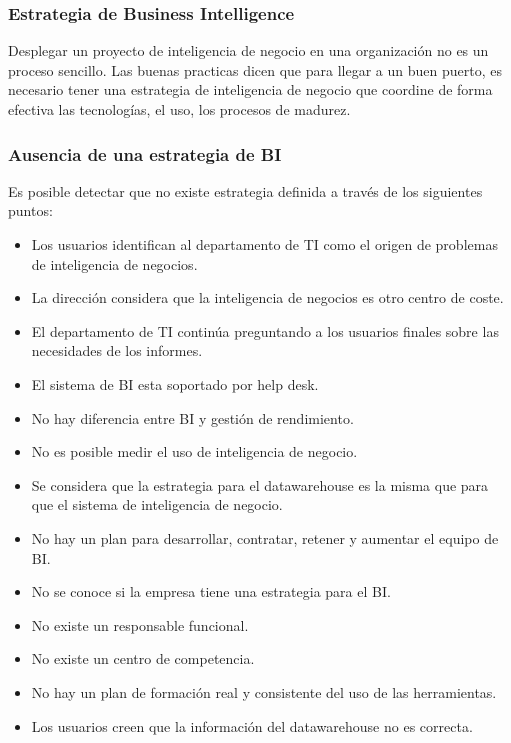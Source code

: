 \documentclass[preprint,12pt]{elsarticle}
\begin{document}
	\subsubsection{\textbf{Estrategia de Business Intelligence}}
	Desplegar un proyecto de inteligencia de negocio en una organización no es un proceso sencillo. Las buenas practicas dicen 
	que para llegar a un buen puerto, es necesario tener una estrategia de inteligencia de negocio que coordine de forma efectiva 
	las tecnologías, el uso, los procesos de madurez.\cite{referenciarobles2}
	\subsubsection{\textbf{Ausencia de una estrategia de BI}}
	Es posible detectar que no existe estrategia definida a través de los siguientes puntos:

	\begin{itemize}
	\item Los usuarios identifican al departamento de TI como el origen de problemas de inteligencia de negocios.
	\item La dirección considera que la inteligencia de negocios es otro centro de coste.
	\item El departamento de TI continúa preguntando a los usuarios finales sobre las necesidades de los informes.
	\item El sistema de BI esta soportado por help desk.
	\item No hay diferencia entre BI y gestión de rendimiento.
	\item No es posible medir el uso de inteligencia de negocio.
	\item Se considera que la estrategia para el datawarehouse es la misma que para que el sistema de inteligencia de negocio.

	\item No hay un plan para desarrollar, contratar, retener y aumentar el equipo de BI.
	\item No se conoce si la empresa tiene una estrategia para el BI.
	\item No existe un responsable funcional.
	\item No existe un centro de competencia.
	\item No hay un plan de formación real y consistente del uso de las herramientas.
	\item Los usuarios creen que la información del datawarehouse no es correcta.
	\end{itemize}
\end{document}
